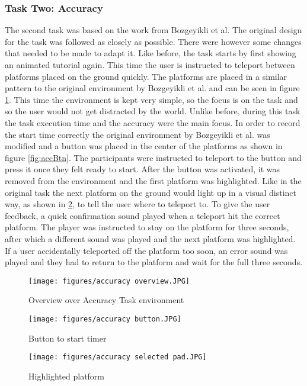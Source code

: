 \subsubsection{Task Two: Accuracy}
The second task was based on the work from Bozgeyikli et al. %
The original design for the task was followed as closely as possible. There were however some changes that needed to be made to adapt it. Like before, the task starts by first showing an animated tutorial again. This time the user is instructed to teleport between platforms placed on the ground quickly. The platforms are placed in a similar pattern to the original environment by Bozgeyikli et al. and can be seen in figure \ref{fig:accOver}. This time the environment is kept very simple, so the focus is on the task and so the user would not get distracted by the world. Unlike before, during this task the task execution time and the accuracy were the main focus. In order to record the start time correctly the original environment by Bozgeyikli et al. was modified and a button was placed in the center of the platforms as shown in figure \ref{fig:accBtn}. The participants were instructed to teleport to the button and press it once they felt ready to start. After the button was activated, it was removed from the environment and the first platform was highlighted. Like in the original task the next platform on the ground would light up in a visual distinct way, as shown in \ref{fig:accPad}, to tell the user where to teleport to. To give the user feedback, a quick confirmation sound played when a teleport hit the correct platform. The player was instructed to stay on the platform for three seconds, after which a different sound was played and the next platform was highlighted. If a user accidentally teleported off the platform too soon, an error sound was played and they had to return to the platform and wait for the full three seconds. 

\begin{figure}[!ht]
    \centering
    \texttt{[image: figures/accuracy overview.JPG]}
    \caption{Overview over Accuracy Task environment}
    \label{fig:accOver}
\end{figure}

\begin{figure}[!htb]
        \texttt{[image: figures/accuracy button.JPG]}
        \caption{Button to start timer}
        \label{fig:accBtn}
    \endminipage\hfill
        \texttt{[image: figures/accuracy selected pad.JPG]}
        \caption{Highlighted platform}
        \label{fig:accPad}
    \endminipage\hfill
\end{figure}

